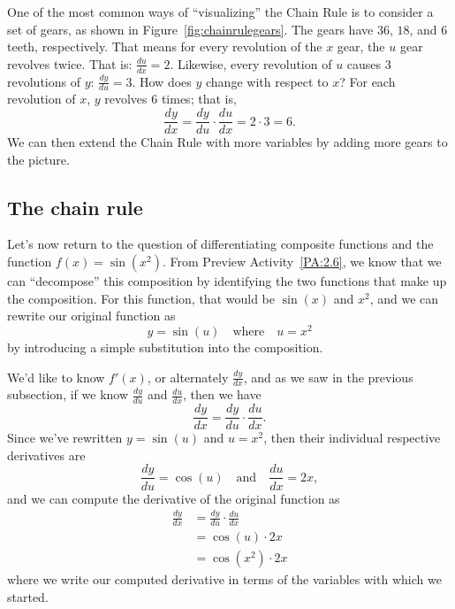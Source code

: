 One of the most common ways of ``visualizing'' the Chain Rule is to consider a set of gears, as shown in Figure~\ref{fig:chainrulegears}. The gears have $36$, $18$, and $6$ teeth, respectively. That means for every revolution of the $x$ gear, the $u$ gear revolves twice. That is: $\frac{du}{dx} = 2$. Likewise, every revolution of $u$ causes $3$ revolutions of $y$: $\frac{dy}{du} = 3$. How does $y$ change with respect to $x$? For each revolution of $x$, $y$ revolves $6$ times; that is, $$\frac{dy}{dx} = \frac{dy}{du}\cdot \frac{du}{dx} = 2\cdot 3 = 6.$$
We can then extend the Chain Rule with more variables by adding more gears to the picture.

\subsection*{The chain rule}

Let's now return to the question of differentiating composite functions and the function $f(x) = \sin(x^2)$.  From Preview Activity~\ref{PA:2.6}, we know that we can ``decompose'' this composition by identifying the two functions that make up the composition.  For this function, that would be $\sin(x)$ and $x^2$, and we can rewrite our original function as
\[ y = \sin(u) \quad \mbox{where} \quad u = x^2 \] 
by introducing a simple substitution into the composition.

We'd like to know $f'(x)$, or alternately $\frac{dy}{dx}$, and as we saw in the previous subsection, if we know $\frac{dy}{du}$ and $\frac{du}{dx}$, then we have
\[ \frac{dy}{dx} = \frac{dy}{du} \cdot \frac{du}{dx}. \]
Since we've rewritten $y = \sin(u)$ and $u = x^2$, then their individual respective derivatives are
\[ \frac{dy}{du} = \cos(u) \quad \mbox{and} \quad \frac{du}{dx} = 2x, \]
and we can compute the derivative of the original function as
\begin{align*}
\frac{dy}{dx} &= \frac{dy}{du} \cdot \frac{du}{dx} \\
&= \cos(u) \cdot 2x \\
&= \cos(x^2) \cdot 2x
\end{align*}
where we write our computed derivative in terms of the variables with which we started.


